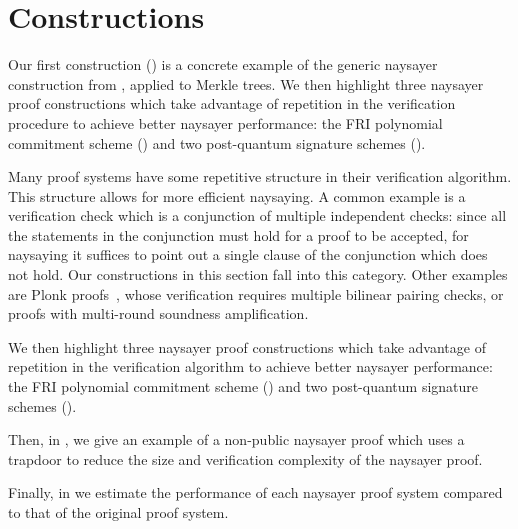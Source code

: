 \section{Constructions}\label{sec:naysayer_apps}

Our first construction () is a concrete example of the generic naysayer construction from , applied to Merkle trees. 
We then highlight three naysayer proof constructions which take advantage of repetition in the verification procedure to achieve better naysayer performance: the FRI polynomial commitment scheme () and two post-quantum signature schemes (). 

Many proof systems have some repetitive structure in their verification algorithm. This structure allows for more efficient naysaying. A common example is a verification check which is a conjunction of multiple independent checks: since all the statements in the conjunction must hold for a proof to be accepted, for naysaying it suffices to point out a single clause of the conjunction which does not hold. Our constructions in this section fall into this category. Other examples are Plonk proofs~\cite{EPRINT:GabWilCio19}, whose verification requires multiple bilinear pairing checks, or proofs with multi-round soundness amplification.

We then highlight three naysayer proof constructions which take advantage of repetition in the verification algorithm to achieve better naysayer performance: the FRI polynomial commitment scheme () and two post-quantum signature schemes (). 

Then, in , we give an example of a non-public naysayer proof which uses a trapdoor to reduce the size and verification complexity of the naysayer proof. %

Finally, in  we
estimate the performance of each naysayer proof system compared to that of the original proof system.

